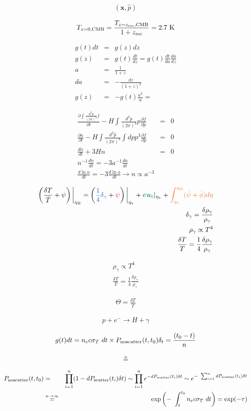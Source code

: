 \documentclass[a4paper, 11pt]{article}
\def\ba{\begin{eqnarray}}
\def\ea{\end{eqnarray}}
\newcommand{\red}[1]{{\color{red}#1}}
\newcommand{\green}[1]{{\color{ForestGreen}#1}}
\newcommand{\cyan}[1]{{\color{Orange}#1}}
\newcommand{\blue}[1]{{\color{denim}#1}}
\begin{document}
\ba
(\bm{x}, \hat{p})
\ea



\ba
T_{z=0, \rm CMB} = \frac{T_{z=z_{\rm rec}, \rm CMB}}{1 +z_{\rm rec}} = 2.7 \ \rm K
 \ea

\ba
g(t)dt &=& g(z)dz  \\
g(z) &=& g(t) \frac{dt}{dz} = g(t) \frac{dt}{da}\frac{da}{dz} \\
a &=& \frac{1}{1+z} \\
da &=& - \frac{dz}{(1+z)^{2}}  \\
g(z) &=&  - g(t) \frac{a^{2}}{\dot{a}} = 
\ea


\ba
 \frac{\partial  \int \frac{d^{3}p}{(2\pi)^{3}} f}{ \partial t} - H   \int \frac{d^{3}p}{(2\pi)^{3}} p \frac{\partial f}{ \partial p} &=& 0 \\
 \frac{\partial  n}{ \partial t} - H \int \frac{d^{2}\hat{p}}{(2\pi)^{3}} \int dp p^{3} \frac{\partial f}{ \partial p} &=& 0 \\
 \frac{d  n}{ d t} + 3 H n &=& 0 \\
n^{-1}  \frac{d  n}{ d t}  = - 3 a^{-1} \frac{d  a}{ d t}  \\
 \frac{d \ln  n}{ d t}  = - 3 \frac{d  \ln a}{ d t}  \longrightarrow n \propto a^{-3}
 \ea
 
 \ba
 \left(\frac{\delta T}{\bar{T}} + \psi \right) \bigg|_{\eta_{R}} = \left(\blue{\frac{1}{4}\delta_{\gamma}} + \red{\psi} \right)\bigg|_{\eta_{*}} + \green{\bm{e}{\bm u_{b}}} |_{\eta_{*}} + \cyan{\int_{\eta_{*}}^{\eta_{R}}(\dot{\psi} + \dot{\phi}) d\eta} \\
\delta_{\gamma} = \frac{ \delta \rho_{\gamma}}{\rho_{\gamma}} \\
\rho_{\gamma} \propto T^{4} \\
\frac{\delta T}{T} = \frac{1}{4} \frac{ \delta \rho_{\gamma}}{\rho_{\gamma}}
 \ea
 
 


\ba
\rho_{\gamma} \propto T^{4} \\
\frac{\delta T}{T} = \frac{1}{4} \frac{ \delta \rho_{\gamma}}{\rho_{\gamma}}
 \ea
 
 \ba
 \Theta = \frac{\delta T}{\bar{T}}
 \ea
 
 
 
 \ba
 p + e^{-} \longrightarrow H + \gamma
 \ea
 
 \ba
 g(t) dt = n_{e} c \sigma_{T} dt  \times P_{\rm no scatter}(t, t_{0})
 \delta_{t}=\frac{(t_{0}-t)}{n}
 \ea
 
 \ba
 \stackrel{n}{=}
 \ea
 
  
 \ba
 P_{\rm no scatter}(t, t_{0}) &=& \prod^{n}_{i=1} (1 - dP_{\rm scatter}(t_{i})\delta t) \sim \prod^{n}_{i=1}  e^{- dP_{\rm scatter}(t_{i})\delta t} \sim   e^{- \sum_{i=1}^{n} dP_{\rm scatter}(t_{i})\delta t} \\
 & \stackrel{n \rightarrow \infty}{=}&   \exp \left(- \int^{t_{0}}_{t}  n_{e} c \sigma_{T} dt \right) =  \exp(-\tau) \nonumber 
 \ea
\end{document}
